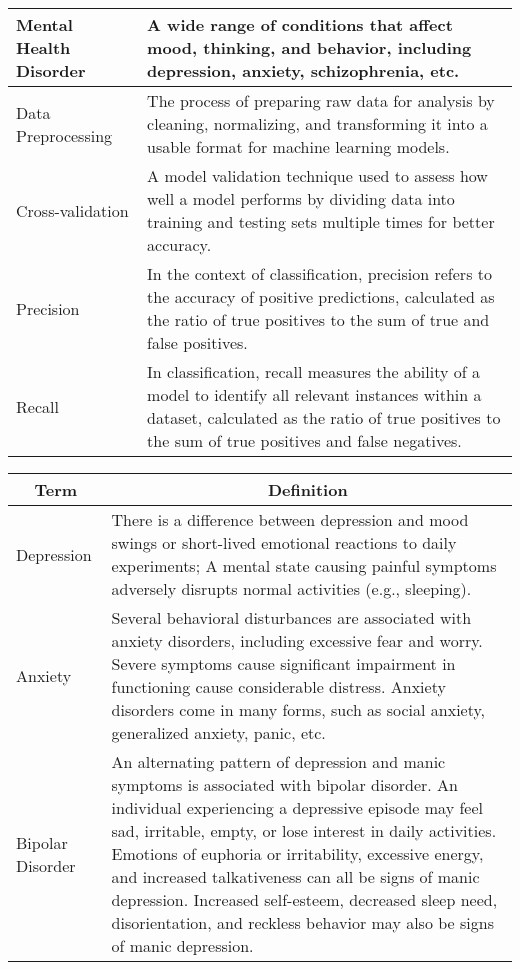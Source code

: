 \begin{center}
\begin{tabular}{|p{4cm}|p{10cm}|}
  \hline
  Mental Health Disorder & A wide range of conditions that affect mood, thinking, and behavior, including depression, anxiety, schizophrenia, etc. \\

  \hline
  Data Preprocessing & The process of preparing raw data for analysis by cleaning, normalizing, and transforming it into a usable format for machine learning models. \\

  \hline 
  Cross-validation & A model validation technique used to assess how well a model performs by dividing data into training and testing sets multiple times for better accuracy. \\

  \hline
  Precision & In the context of classification, precision refers to the accuracy of positive predictions, calculated as the ratio of true positives to the sum of true and false positives. \\

  \hline
  Recall & In classification, recall measures the ability of a model to identify all relevant instances within a dataset, calculated as the ratio of true positives to the sum of true positives and false negatives. \\
  
  \hline
\end{tabular}

\pagebreak

\begin{tabular}{|p{4cm}|p{10cm}|}
  \hline
  \multicolumn{1}{|c|}{\textbf{Term}} & \multicolumn{1}{c|}{\textbf{Definition}} \\

  \hline
  Depression & There is a difference between depression and mood swings or short-lived emotional reactions to daily experiments; A mental state causing painful symptoms adversely disrupts normal activities (e.g., sleeping). \\

  \hline
  Anxiety & Several behavioral disturbances are associated with anxiety disorders, including excessive fear and worry. Severe symptoms cause significant impairment in functioning cause considerable distress. Anxiety disorders come in many forms, such as social anxiety, generalized anxiety, panic, etc. \\

  \hline
  Bipolar Disorder & An alternating pattern of depression and manic symptoms is associated with bipolar disorder. An individual experiencing a depressive episode may feel sad, irritable, empty, or lose interest in daily activities. Emotions of euphoria or irritability, excessive energy, and increased talkativeness can all be signs of manic depression. Increased self-esteem, decreased sleep need, disorientation, and reckless behavior may also be signs of manic depression. \\


\end{tabular}
\end{center}
